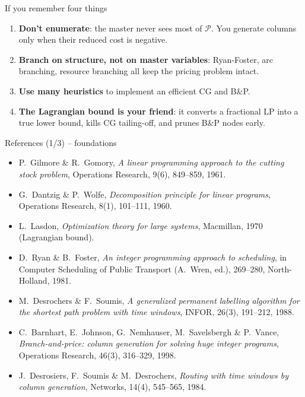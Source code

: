 \documentclass[10pt,aspectratio=169]{beamer}
\begin{document}
\begin{frame}{If you remember four things}
  \begin{enumerate}\setlength{\itemsep}{6pt}
    \item \textbf{Don't enumerate}: the master never sees most of $\mathcal P$.
          You generate columns only when their reduced cost is negative.
    \item \textbf{Branch on structure, not on master variables}: Ryan-Foster,
          arc branching, resource branching all keep the pricing problem
          intact.
    \item \textbf{Use many heuristics} to implement an efficient CG and B\&P.
    \item \textbf{The Lagrangian bound is your friend}: it converts a
          fractional LP into a true lower bound, kills CG tailing-off, and
          prunes B\&P nodes early.
  \end{enumerate}
\end{frame}

\begin{frame}{References (1/3) -- foundations}
  \scriptsize
  \begin{itemize}\setlength{\itemsep}{2pt}
    \item P.~Gilmore \& R.~Gomory, \emph{A linear programming approach to the
          cutting stock problem}, Operations Research, 9(6), 849--859, 1961.
    \item G.~Dantzig \& P.~Wolfe, \emph{Decomposition principle for linear
          programs}, Operations Research, 8(1), 101--111, 1960.
    \item L.~Lasdon, \emph{Optimization theory for large systems},
          Macmillan, 1970 (Lagrangian bound).
    \item D.~Ryan \& B.~Foster, \emph{An integer programming approach to
          scheduling}, in Computer Scheduling of Public Transport
          (A.~Wren, ed.), 269--280, North-Holland, 1981.
    \item M.~Desrochers \& F.~Soumis, \emph{A generalized permanent labelling
          algorithm for the shortest path problem with time windows},
          INFOR, 26(3), 191--212, 1988.
    \item C.~Barnhart, E.~Johnson, G.~Nemhauser, M.~Savelsbergh \& P.~Vance,
          \emph{Branch-and-price: column generation for solving huge integer
          programs}, Operations Research, 46(3), 316--329, 1998.
    \item J.~Desrosiers, F.~Soumis \& M.~Desrochers, \emph{Routing with time
          windows by column generation}, Networks, 14(4), 545--565, 1984.
  \end{itemize}
\end{frame}
\end{document}
